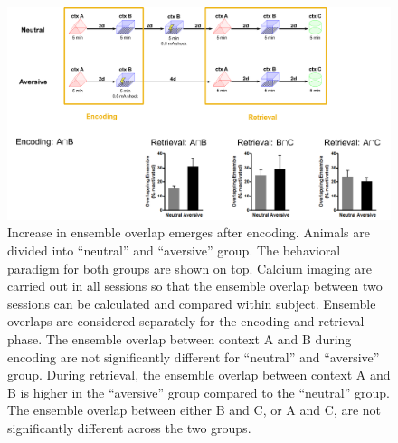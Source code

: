 \documentclass[master.tex]{subfiles}
\begin{document}
\begin{figure}
  \centering \includegraphics[scale = .09]{Figures/val_retro_prelim_imag.pdf}
  \caption{\footnotesize Increase in ensemble overlap emerges after encoding.
    Animals are divided into ``neutral'' and ``aversive'' group. The behavioral
    paradigm for both groups are shown on top. Calcium imaging are carried out
    in all sessions so that the ensemble overlap between two sessions can be
    calculated and compared within subject. Ensemble overlaps are considered
    separately for the encoding and retrieval phase. The ensemble overlap
    between context A and B during encoding are not significantly different for
    ``neutral'' and ``aversive'' group. During retrieval, the ensemble overlap
    between context A and B is higher in the ``aversive'' group compared to the
    ``neutral'' group. The ensemble overlap between either B and C, or A and C,
    are not significantly different across the two groups.}
  \label{fig:prelim_val_imag}
\end{figure}

\end{document}
